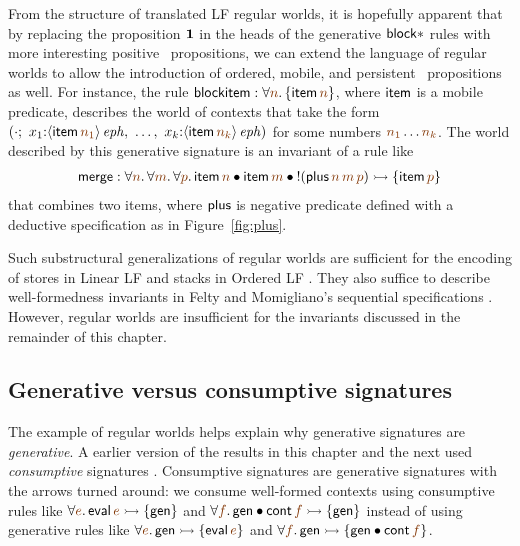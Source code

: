 From the structure of translated LF regular worlds, it is hopefully
apparent that by replacing the proposition $\mathbf{1}$ in the heads of the
generative ${\sf block*}$ rules with more interesting positive
\sls~propositions,  we can extend the language of regular
worlds to allow the introduction of ordered, mobile, and persistent
\sls~propositions as well. For instance, the rule
${\sf blockitem} : 
\forall \lf{n}. \, \{ {\sf item}\,\lf{n} \}$,
where ${\sf item}$ is a mobile predicate,
describes the world of contexts that take the form
$\left(\cdot; ~ x_1{:}\iseph{\susp{{\sf item}\,\lf{n_1}}}, ~
         \ldots, ~
         x_k{:}\iseph{\susp{{\sf item}\,\lf{n_k}}}\right)$
for some numbers $\lf{n_1}\ldots\lf{n_k}$. 
The world described by this generative signature is an invariant of a
rule like
\begin{align*}
  {\sf merge} : 
  \forall \lf{n}.\,\forall\lf{m}.\,\forall\lf{p}.\,
   {\sf item}\,\lf{n} \fuse
   {\sf item}\,\lf{m} \fuse
   {!}({\sf plus}\,\lf{n}\,\lf{m}\,\lf{p}) 
    \lefti \{ {\sf item}\,\lf{p} \}
\end{align*}
that combines two items,
where ${\sf plus}$ is  negative predicate defined with a deductive
specification as in
Figure~\ref{fig:plus}.  

Such substructural generalizations of regular worlds are sufficient
for the encoding of stores in Linear LF \cite{cervesato02linear} and
stacks in Ordered LF \cite{polakow01ordered}. They also suffice
to describe well-formedness invariants in Felty and Momigliano's
sequential specifications \cite{felty12hybrid}. However, regular
worlds are insufficient for the
invariants discussed in the remainder of this chapter.

\subsection{Generative versus consumptive signatures}

The example of regular worlds helps explain why generative signatures are
{\it generative}. A earlier version of the results in this chapter and
the next used {\it consumptive} signatures
\cite{simmons10type}. Consumptive signatures are generative
signatures with the arrows turned around: we consume well-formed
contexts using consumptive rules like $\forall\lf{e}.\,{\sf
  eval}\,\lf{e} \lefti \{ {\sf gen} \}$ and $\forall \lf{f}.\,{\sf
  gen} \fuse {\sf cont}\,\lf{f} \lefti \{ {\sf gen} \}$ instead of
using generative 
rules like $\forall\lf{e}.\,{\sf gen}\lefti \{ {\sf eval}\,\lf{e} \}$
and $\forall \lf{f}.\,{\sf gen} \lefti \{ {\sf gen} \fuse {\sf
  cont}\,\lf{f} \}$. 

